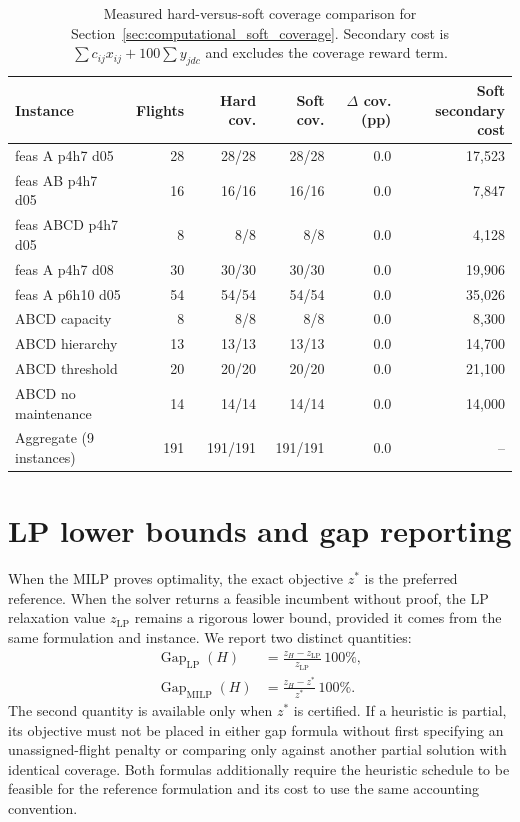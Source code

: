 \begin{table}[t]
\centering\small
\caption{Measured hard-versus-soft coverage comparison for Section~\ref{sec:computational_soft_coverage}.
Secondary cost is
$\sum c_{ij}x_{ij}+100\sum y_{jdc}$
and excludes the coverage reward term.}
\label{tab:soft_coverage_measured}
\begin{tabular}{lrrrrr}
\toprule
Instance & Flights & Hard cov. & Soft cov. & $\Delta$ cov. (pp) & Soft secondary cost \\
\midrule
feas A p4h7 d05 & 28 & 28/28 & 28/28 & 0.0 & 17,523 \\
feas AB p4h7 d05 & 16 & 16/16 & 16/16 & 0.0 & 7,847 \\
feas ABCD p4h7 d05 & 8 & 8/8 & 8/8 & 0.0 & 4,128 \\
feas A p4h7 d08 & 30 & 30/30 & 30/30 & 0.0 & 19,906 \\
feas A p6h10 d05 & 54 & 54/54 & 54/54 & 0.0 & 35,026 \\
ABCD capacity & 8 & 8/8 & 8/8 & 0.0 & 8,300 \\
ABCD hierarchy & 13 & 13/13 & 13/13 & 0.0 & 14,700 \\
ABCD threshold & 20 & 20/20 & 20/20 & 0.0 & 21,100 \\
ABCD no maintenance & 14 & 14/14 & 14/14 & 0.0 & 14,000 \\
\midrule
Aggregate (9 instances) & 191 & 191/191 & 191/191 & 0.0 & -- \\
\bottomrule
\end{tabular}
\end{table}

\section{LP lower bounds and gap reporting}
\label{sec:computational_lp}

When the MILP proves optimality, the exact objective $z^*$ is the preferred
reference. When the solver returns a feasible incumbent without proof, the LP
relaxation value $z_{\mathrm{LP}}$ remains a rigorous lower bound, provided it
comes from the same formulation and instance. We report two distinct quantities:
\begin{align}
    \operatorname{Gap}_{\mathrm{LP}}(H)
    &= \frac{z_H-z_{\mathrm{LP}}}{z_{\mathrm{LP}}}\,100\%,\\
    \operatorname{Gap}_{\mathrm{MILP}}(H)
    &= \frac{z_H-z^*}{z^*}\,100\%.
\end{align}
The second quantity is available only when $z^*$ is certified. If a heuristic is
partial, its objective must not be placed in either gap formula without first
specifying an unassigned-flight penalty or comparing only against another
partial solution with identical coverage.
Both formulas additionally require the heuristic schedule to be feasible for
the reference formulation and its cost to use the same accounting convention.


